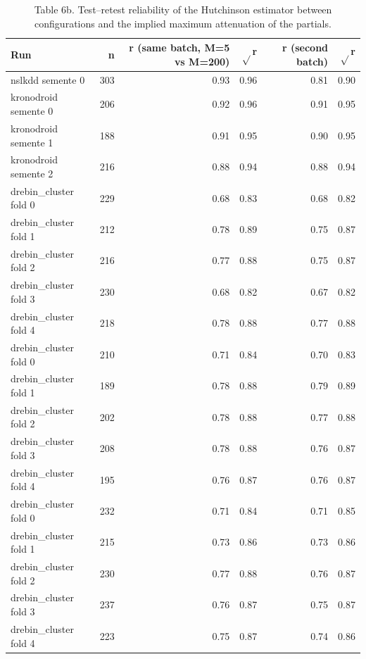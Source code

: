 \begin{table}[t]
\centering\small
\caption{Table 6b. Test–retest reliability of the Hutchinson estimator between configurations and the implied maximum attenuation of the partials.}
\label{tab:reliability}
\begin{tabular}{lrrrrr}
\toprule
Run & n & r (same batch, M=5 vs M=200) & $\sqrt{}$r & r (second batch) & $\sqrt{}$r \\
\midrule
nslkdd semente 0 & 303 & 0.93 & 0.96 & 0.81 & 0.90 \\
kronodroid semente 0 & 206 & 0.92 & 0.96 & 0.91 & 0.95 \\
kronodroid semente 1 & 188 & 0.91 & 0.95 & 0.90 & 0.95 \\
kronodroid semente 2 & 216 & 0.88 & 0.94 & 0.88 & 0.94 \\
drebin\_cluster fold 0 & 229 & 0.68 & 0.83 & 0.68 & 0.82 \\
drebin\_cluster fold 1 & 212 & 0.78 & 0.89 & 0.75 & 0.87 \\
drebin\_cluster fold 2 & 216 & 0.77 & 0.88 & 0.75 & 0.87 \\
drebin\_cluster fold 3 & 230 & 0.68 & 0.82 & 0.67 & 0.82 \\
drebin\_cluster fold 4 & 218 & 0.78 & 0.88 & 0.77 & 0.88 \\
drebin\_cluster fold 0 & 210 & 0.71 & 0.84 & 0.70 & 0.83 \\
drebin\_cluster fold 1 & 189 & 0.78 & 0.88 & 0.79 & 0.89 \\
drebin\_cluster fold 2 & 202 & 0.78 & 0.88 & 0.77 & 0.88 \\
drebin\_cluster fold 3 & 208 & 0.78 & 0.88 & 0.76 & 0.87 \\
drebin\_cluster fold 4 & 195 & 0.76 & 0.87 & 0.76 & 0.87 \\
drebin\_cluster fold 0 & 232 & 0.71 & 0.84 & 0.71 & 0.85 \\
drebin\_cluster fold 1 & 215 & 0.73 & 0.86 & 0.73 & 0.86 \\
drebin\_cluster fold 2 & 230 & 0.77 & 0.88 & 0.76 & 0.87 \\
drebin\_cluster fold 3 & 237 & 0.76 & 0.87 & 0.75 & 0.87 \\
drebin\_cluster fold 4 & 223 & 0.75 & 0.87 & 0.74 & 0.86 \\
\bottomrule
\end{tabular}
\end{table}
